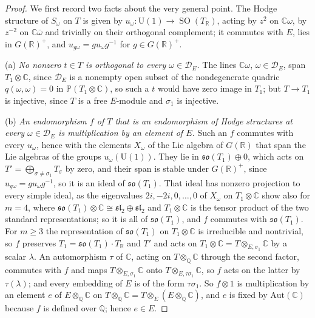 \documentclass[11pt,reqno]{amsart}
\theoremstyle{plain}
\theoremstyle{definition}
\theoremstyle{remark}
\newcommand{\QQ}{\mathbb{Q}}
\newcommand{\RR}{\mathbb{R}}
\newcommand{\CC}{\mathbb{C}}
\newcommand{\PP}{\mathbb{P}}
\newcommand{\cD}{\mathcal{D}}
\DeclareMathOperator{\SO}{SO}
\begin{document}
\begin{proof}
We first record two facts about the very general point. The Hodge structure
of $S_{\omega}$ on $T$ is given by
$u_{\omega}\colon\mathrm{U}(1)\to\SO(T_{\RR})$, acting by $z^{2}$ on
$\CC\omega$, by $z^{-2}$ on $\CC\bar\omega$ and trivially on their orthogonal
complement; it commutes with $E$, lies in $G(\RR)^{+}$, and
$u_{g\omega}=gu_{\omega}g^{-1}$ for $g\in G(\RR)^{+}$.

(a) \emph{No nonzero $t\in T$ is orthogonal to every $\omega\in\cD_{E}$.} The
lines $\CC\omega$, $\omega\in\cD_{E}$, span $T_{1}\otimes\CC$, since
$\cD_{E}$ is a nonempty open subset of the nondegenerate quadric
$q(\omega,\omega)=0$ in $\PP(T_{1}\otimes\CC)$, so such a $t$
would have zero image in $T_{1}$; but $T\to T_{1}$ is injective, since $T$ is
a free $E$-module and $\sigma_{1}$ is injective.

(b) \emph{An endomorphism $f$ of $T$ that is an endomorphism of Hodge
structures at every $\omega\in\cD_{E}$ is multiplication by an element of
$E$.} Such an $f$ commutes with every $u_{\omega}$, hence with the elements
$X_{\omega}$ of the Lie algebra of $G(\RR)$ that span the Lie algebras of
the groups $u_{\omega}(\mathrm{U}(1))$. They lie in
$\mathfrak{so}(T_{1})\oplus0$, which acts on
$T'=\bigoplus_{\sigma\ne\sigma_{1}}T_{\sigma}$ by zero, and their span is
stable under $G(\RR)^{+}$, since $u_{g\omega}=gu_{\omega}g^{-1}$, so it is an
ideal of $\mathfrak{so}(T_{1})$. That ideal has nonzero projection to every
simple ideal, as the eigenvalues $2i,-2i,0,\dots,0$ of $X_{\omega}$ on
$T_{1}\otimes\CC$ show also for $m=4$, where
$\mathfrak{so}(T_{1})\otimes\CC\cong\mathfrak{sl}_{2}\oplus\mathfrak{sl}_{2}$
and $T_{1}\otimes\CC$ is the tensor product of the two standard
representations; so it is all of $\mathfrak{so}(T_{1})$, and $f$ commutes
with $\mathfrak{so}(T_{1})$. For $m\ge3$ the representation of
$\mathfrak{so}(T_{1})$ on $T_{1}\otimes\CC$ is irreducible and nontrivial, so
$f$ preserves $T_{1}=\mathfrak{so}(T_{1})\cdot T_{\RR}$ and $T'$ and acts on
$T_{1}\otimes\CC=T\otimes_{E,\sigma_{1}}\CC$ by a scalar $\lambda$. An
automorphism $\tau$ of $\CC$, acting on $T\otimes_{\QQ}\CC$ through the
second factor, commutes with $f$ and maps $T\otimes_{E,\sigma_{1}}\CC$ onto
$T\otimes_{E,\tau\sigma_{1}}\CC$, so $f$ acts on the latter by
$\tau(\lambda)$; and every embedding of $E$ is of the form $\tau\sigma_{1}$.
So $f\otimes1$ is multiplication by an element $e$ of $E\otimes_{\QQ}\CC$ on
$T\otimes_{\QQ}\CC=T\otimes_{E}(E\otimes_{\QQ}\CC)$, and $e$ is fixed by
$\mathrm{Aut}(\CC)$ because $f$ is defined over $\QQ$; hence $e\in E$.


\end{proof}
\end{document}
